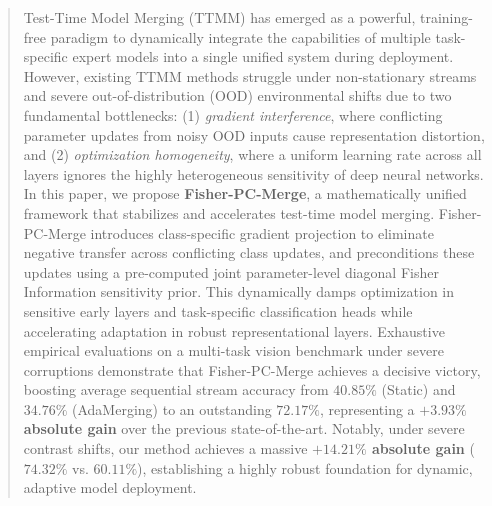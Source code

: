 \documentclass{article}
\theoremstyle{plain}
\theoremstyle{definition}
\theoremstyle{remark}
\begin{document}

\printAffiliationsAndNotice{\icmlEqualContribution}

\begin{abstract}
Test-Time Model Merging (TTMM) has emerged as a powerful, training-free paradigm to dynamically integrate the capabilities of multiple task-specific expert models into a single unified system during deployment. However, existing TTMM methods struggle under non-stationary streams and severe out-of-distribution (OOD) environmental shifts due to two fundamental bottlenecks: (1) \emph{gradient interference}, where conflicting parameter updates from noisy OOD inputs cause representation distortion, and (2) \emph{optimization homogeneity}, where a uniform learning rate across all layers ignores the highly heterogeneous sensitivity of deep neural networks. In this paper, we propose \textbf{Fisher-PC-Merge}, a mathematically unified framework that stabilizes and accelerates test-time model merging. Fisher-PC-Merge introduces class-specific gradient projection to eliminate negative transfer across conflicting class updates, and preconditions these updates using a pre-computed joint parameter-level diagonal Fisher Information sensitivity prior. This dynamically damps optimization in sensitive early layers and task-specific classification heads while accelerating adaptation in robust representational layers. Exhaustive empirical evaluations on a multi-task vision benchmark under severe corruptions demonstrate that Fisher-PC-Merge achieves a decisive victory, boosting average sequential stream accuracy from $40.85\%$ (Static) and $34.76\%$ (AdaMerging) to an outstanding \textbf{$72.17\%$}, representing a \textbf{$+3.93\%$ absolute gain} over the previous state-of-the-art. Notably, under severe contrast shifts, our method achieves a massive \textbf{$+14.21\%$ absolute gain} ($74.32\%$ vs. $60.11\%$), establishing a highly robust foundation for dynamic, adaptive model deployment.
\end{abstract}
\end{document}
